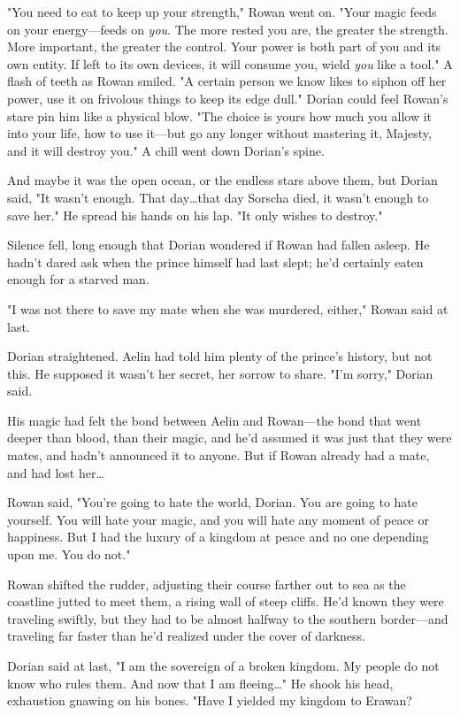 "You need to eat to keep up your strength," Rowan went on.
"Your magic feeds on your energy---feeds on \emph{you}.
The more rested you are, the greater the strength.
More important, the greater the control.
Your power is both part of you and its own entity.
If left to its own devices, it will consume you, wield \emph{you} like a tool."
A flash of teeth as Rowan smiled.
"A certain person we know likes to siphon off her power, use it on frivolous things to keep its edge dull."
Dorian could feel Rowan's stare pin him like a physical blow.
"The choice is yours how much you allow it into your life, how to use it---but go any longer without mastering it, Majesty, and it will destroy you."
A chill went down Dorian's spine.

And maybe it was the open ocean, or the endless stars above them, but Dorian said, "It wasn't enough.
That day\ldots that day Sorscha died, it wasn't enough to save her."
He spread his hands on his lap.
"It only wishes to destroy."

Silence fell, long enough that Dorian wondered if Rowan had fallen asleep.
He hadn't dared ask when the prince himself had last slept; he'd certainly eaten enough for a starved man.

"I was not there to save my mate when she was murdered, either," Rowan said at last.

Dorian straightened.
Aelin had told him plenty of the prince's history, but not this.
He supposed it wasn't her secret, her sorrow to share.
"I'm sorry," Dorian said.

His magic had felt the bond between Aelin and Rowan---the bond that went deeper than blood, than their magic, and he'd assumed it was just that they were mates, and hadn't announced it to anyone.
But if Rowan already had a mate, and had lost her\ldots{}

Rowan said, "You're going to hate the world, Dorian.
You are going to hate yourself.
You will hate your magic, and you will hate any moment of peace or happiness.
But I had the luxury of a kingdom at peace and no one depending upon me.
You do not."

Rowan shifted the rudder, adjusting their course farther out to sea as the coastline jutted to meet them, a rising wall of steep cliffs.
He'd known they were traveling swiftly, but they had to be almost halfway to the southern border---and traveling far faster than he'd realized under the cover of darkness.

Dorian said at last, "I am the sovereign of a broken kingdom.
My people do not know who rules them.
And now that I am fleeing\ldots" He shook his head, exhaustion gnawing on his bones.
"Have I yielded my kingdom to Erawan?

